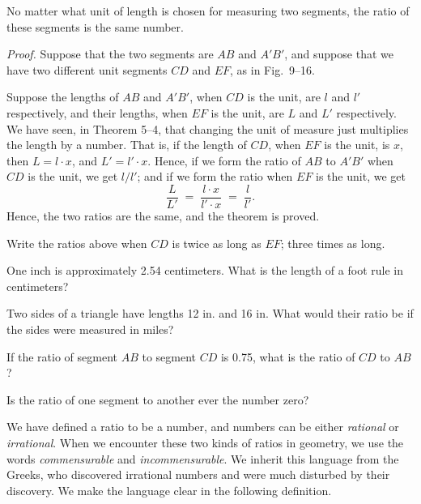 \documentclass[11pt]{book}
\begin{document}
\begin{theorem}
No matter what unit of length is chosen for measuring two segments, the ratio of
these segments is the same number.
\end{theorem}

\noindent\emph{Proof.} Suppose that the two segments are $AB$ and $A'B'$, and
suppose that we have two different unit segments $CD$ and $EF$, as in Fig.~9--16.

\FIGIXSIXTEEN

\noindent Suppose the lengths of $AB$ and $A'B'$, when $CD$ is the unit, are $l$
and $l'$ respectively, and their lengths, when $EF$ is the unit, are $L$ and $L'$
respectively. We have seen, in Theorem 5--4, that changing the unit of measure
just multiplies the length by a number. That is, if the length of $CD$, when $EF$
is the unit, is $x$, then $L = l \cdot x$, and $L' = l' \cdot x$. Hence, if we
form the ratio of $AB$ to $A'B'$ when $CD$ is the unit, we get $l/l'$; and if we
form the ratio when $EF$ is the unit, we get
\[
  \frac{L}{L'} \;=\; \frac{l \cdot x}{l' \cdot x} \;=\; \frac{l}{l'}.
\]
Hence, the two ratios are the same, and the theorem is proved.

\begin{exercisecols}
\begin{exlist}
\item Write the ratios above when $CD$ is twice as long as $EF$; three times as
      long.
\item One inch is approximately 2.54 centimeters. What is the length of a foot
      rule in centimeters?
\item Two sides of a triangle have lengths 12 in. and 16 in. What would their
      ratio be if the sides were measured in miles?
\item If the ratio of segment $AB$ to segment $CD$ is 0.75, what is the ratio of
      $CD$ to $AB$?
\item Is the ratio of one segment to another ever the number zero?
\end{exlist}
\end{exercisecols}

We have defined a ratio to be a number, and numbers can be either \emph{rational}
or \emph{irrational}. When we encounter these two kinds of ratios in geometry, we
use the words \emph{commensurable} and \emph{incommensurable}. We inherit this
language from the Greeks, who discovered irrational numbers and were much
disturbed by their discovery. We make the language clear in the following
definition.
\end{document}
